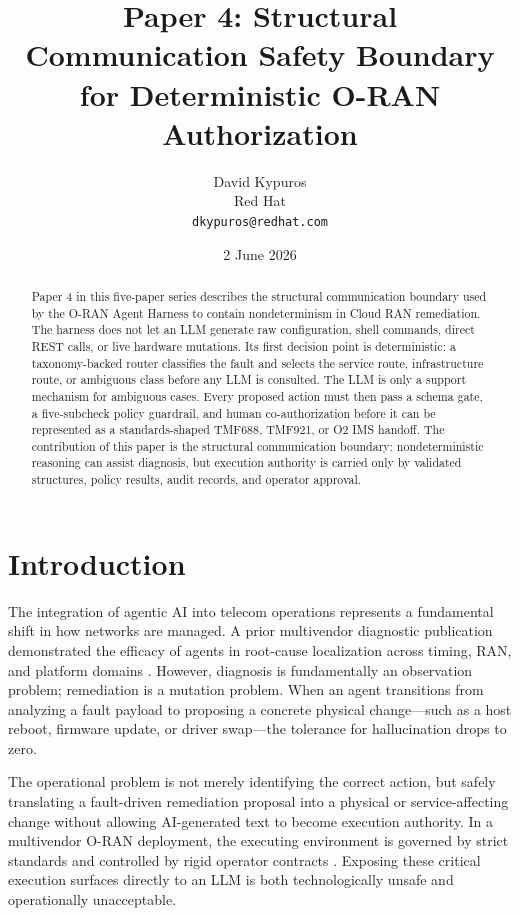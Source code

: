 \documentclass[twocolumn,10pt,a4paper]{article}
\title{Paper 4: Structural Communication Safety Boundary for Deterministic O-RAN Authorization}
\author{David Kypuros \\
\small Red Hat \\
\small \texttt{dkypuros@redhat.com}}
\date{2 June 2026}
\begin{document}
\maketitle

\begin{abstract}
Paper 4 in this five-paper series describes the structural communication boundary used by the O-RAN Agent Harness to contain nondeterminism in Cloud RAN remediation. The harness does not let an LLM generate raw configuration, shell commands, direct REST calls, or live hardware mutations. Its first decision point is deterministic: a taxonomy-backed router classifies the fault and selects the service route, infrastructure route, or ambiguous class before any LLM is consulted. The LLM is only a support mechanism for ambiguous cases. Every proposed action must then pass a schema gate, a five-subcheck policy guardrail, and human co-authorization before it can be represented as a standards-shaped TMF688, TMF921, or O2 IMS handoff. The contribution of this paper is the structural communication boundary: nondeterministic reasoning can assist diagnosis, but execution authority is carried only by validated structures, policy results, audit records, and operator approval.
\end{abstract}

\section{Introduction}

The integration of agentic AI into telecom operations represents a fundamental shift in how networks are managed. A prior multivendor diagnostic publication demonstrated the efficacy of agents in root-cause localization across timing, RAN, and platform domains \cite{multivendor_blog_2026}. However, diagnosis is fundamentally an observation problem; remediation is a mutation problem. When an agent transitions from analyzing a fault payload to proposing a concrete physical change---such as a host reboot, firmware update, or driver swap---the tolerance for hallucination drops to zero.

The operational problem is not merely identifying the correct action, but safely translating a fault-driven remediation proposal into a physical or service-affecting change without allowing AI-generated text to become execution authority. In a multivendor O-RAN deployment, the executing environment is governed by strict standards \cite{oran_wg1_arch,oran_o2_ganp} and controlled by rigid operator contracts \cite{openshift_mco,metal3_bmo}. Exposing these critical execution surfaces directly to an LLM is both technologically unsafe and operationally unacceptable.
\end{document}
